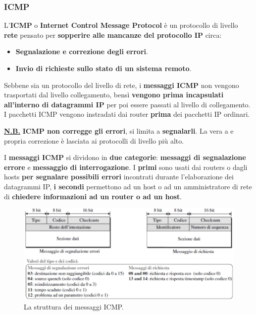 \documentclass[11pt,a4paper,oneside]{book}
\theoremstyle{definition}
\begin{document}
\pagebreak

\subsubsection{ICMP}
L'\textbf{ICMP} o \textbf{Internet Control Message Protocol} è un protocollo di livello \textbf{rete} pensato per \textbf{sopperire alle mancanze del protocollo IP} circa:

\begin{itemize}
	\item \textbf{Segnalazione e correzione degli errori}.
	\item \textbf{Invio di richieste sullo stato di un sistema remoto}.
\end{itemize}

Sebbene sia un protocollo del livello di rete, i \textbf{messaggi ICMP} non vengono trasportati dal livello collegamento, bensì \textbf{vengono prima incapsulati all'interno di datagrammi IP} per poi essere passati al livello di collegamento. I pacchetti ICMP vengono instradati dai router \textbf{prima} dei pacchetti IP ordinari.

\textbf{\underline{N.B.}} \textbf{ICMP non corregge gli errori}, si limita a \textbf{segnalarli}. La vera a e propria correzione è lasciata ai protocolli di livello più alto.

I \textbf{messaggi ICMP} si dividono in \textbf{due categorie}: \textbf{messaggi di segnalazione errore} e \textbf{messaggio di interrogazione}. I \textbf{primi} sono usati dai routers o dagli hosts \textbf{per segnalare possibili errori} incontrati durante l'elaborazione dei datagrammi IP, \textbf{i secondi} permettono ad un host o ad un amministratore di rete di \textbf{chiedere informazioni ad un router o ad un host}.

\begin{figure}[!h]
	\includegraphics[scale=1.3]{Immagini/ICMP.png}
	\centering
	\caption{La struttura dei messaggi ICMP.}
\end{figure}
\end{document}
